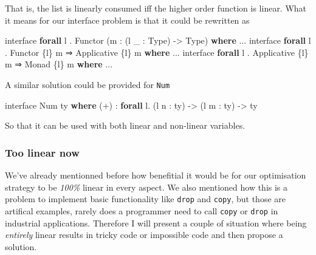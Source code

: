 \documentclass[
]{article}
\newenvironment{Shaded}{}{}
\newcommand{\DataTypeTok}[1]{\textcolor[rgb]{0.56,0.13,0.00}{#1}}
\newcommand{\KeywordTok}[1]{\textcolor[rgb]{0.00,0.44,0.13}{\textbf{#1}}}
\newcommand{\NormalTok}[1]{#1}
\newcommand{\OperatorTok}[1]{\textcolor[rgb]{0.40,0.40,0.40}{#1}}
\newcommand{\OtherTok}[1]{\textcolor[rgb]{0.00,0.44,0.13}{#1}}
\begin{document}
That is, the list is linearly consumed iff the higher order function is
linear. What it means for our interface problem is that it could be
rewritten as

\begin{Shaded}
\begin{Highlighting}[]
\NormalTok{interface }\KeywordTok{forall}\NormalTok{ l }\OperatorTok{.} \DataTypeTok{Functor}\NormalTok{ (m }\OperatorTok{:}\NormalTok{ (l \_ }\OperatorTok{:} \DataTypeTok{Type}\NormalTok{) }\OtherTok{{-}\textgreater{}} \DataTypeTok{Type}\NormalTok{) }\KeywordTok{where}
    \OperatorTok{...}
\NormalTok{interface }\KeywordTok{forall}\NormalTok{ l }\OperatorTok{.} \DataTypeTok{Functor}\NormalTok{ \{l\} m }\OtherTok{⇒} \DataTypeTok{Applicative}\NormalTok{ \{l\} m }\KeywordTok{where}
    \OperatorTok{...}
\NormalTok{interface }\KeywordTok{forall}\NormalTok{ l }\OperatorTok{.} \DataTypeTok{Applicative}\NormalTok{ \{l\} m }\OtherTok{⇒} \DataTypeTok{Monad}\NormalTok{ \{l\} m }\KeywordTok{where}
    \OperatorTok{...}
\end{Highlighting}
\end{Shaded}

A similar solution could be provided for \texttt{Num}

\begin{Shaded}
\begin{Highlighting}[]
\NormalTok{interface }\DataTypeTok{Num}\NormalTok{ ty }\KeywordTok{where}
\NormalTok{    (}\OperatorTok{+}\NormalTok{) }\OperatorTok{:} \KeywordTok{forall}\NormalTok{ l}\OperatorTok{.}\NormalTok{ (l n }\OperatorTok{:}\NormalTok{ ty) }\OtherTok{{-}\textgreater{}}\NormalTok{ (l m }\OperatorTok{:}\NormalTok{ ty) }\OtherTok{{-}\textgreater{}}\NormalTok{ ty}
\end{Highlighting}
\end{Shaded}

So that it can be used with both linear and non-linear variables.

\hypertarget{too-linear-now}{%
\subsubsection{Too linear now}\label{too-linear-now}}

We've already mentionned before how benefitial it would be for our
optimisation strategy to be \emph{100\%} linear in every aspect. We also
mentioned how this is a problem to implement basic functionality like
\texttt{drop} and \texttt{copy}, but those are artifical examples,
rarely does a programmer need to call \texttt{copy} or \texttt{drop} in
industrial applications. Therefore I will present a couple of situation
where being \emph{entirely} linear results in tricky code or impossible
code and then propose a solution.
\end{document}
